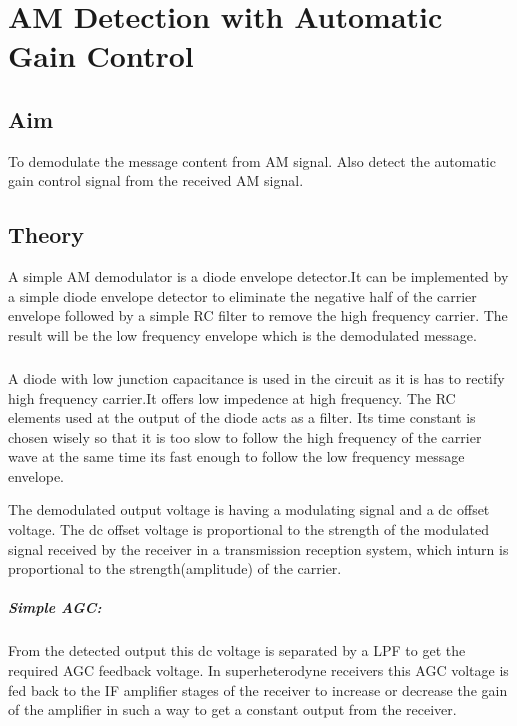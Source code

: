 \chapter[AM Detection with Automatic Gain Control]{AM Detection with Automatic Gain Control}
\label{agcdetect}
\section*{Aim}
To demodulate the message content from AM signal. Also detect the automatic gain control signal from the received AM signal.
\section*{Theory}


A simple AM demodulator is a diode envelope detector.It can be implemented by a simple diode envelope detector to eliminate the negative half of the carrier envelope followed by a simple RC filter to remove the high frequency carrier. The result will be the low frequency envelope which is the demodulated message.

\paragraph{}
A diode with low junction capacitance is used in the circuit as it is has to rectify high frequency carrier.It offers low impedence at high frequency. The RC elements used at the output of the diode acts as a filter. Its time constant is chosen wisely so that it is too slow to follow the high frequency of the carrier wave at the same time its fast enough to follow the low frequency message envelope. 

The demodulated output voltage is having a modulating signal and a dc offset voltage. The dc offset voltage is proportional to the strength of the modulated signal received by the receiver in a transmission reception system, which inturn is proportional to the strength(amplitude) of the carrier.

\paragraph{Simple AGC:} From the detected output this dc voltage is separated by a LPF to get the required AGC feedback voltage. In superheterodyne receivers this AGC voltage is fed back to the IF amplifier stages of the receiver to increase or decrease the gain of the amplifier in such a way to get a constant output from the receiver.


